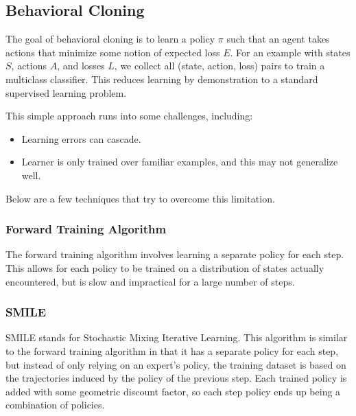 \documentclass[12pt,titlepage]{article}
\begin{document}
    \subsection{Behavioral Cloning}
      The goal of behavioral cloning is to learn a policy $\pi$ such that an agent takes actions that minimize some notion of expected loss $E$. For an example with
      states $S$, actions $A$, and losses $L$, we collect all (state, action, loss) pairs to train a multiclass classifier. This reduces learning by demonstration to
      a standard supervised learning problem.

      This simple approach runs into some challenges, including:
      \begin{itemize}
        \item Learning errors can cascade.
        \item Learner is only trained over familiar examples, and this may not generalize well.
      \end{itemize}

      Below are a few techniques that try to overcome this limitation.

      \subsubsection{Forward Training Algorithm}
        The forward training algorithm involves learning a separate policy for each step. This allows for each policy to be trained on a distribution of states
        actually encountered, but is slow and impractical for a large number of steps.

      \subsubsection{SMILE}
        SMILE stands for Stochastic Mixing Iterative Learning. This algorithm is similar to the forward training algorithm in that it has a separate policy for
        each step, but instead of only relying on an expert's policy, the training dataset is based on the trajectories induced by the policy of the previous
        step. Each trained policy is added with some geometric discount factor, so each step policy ends up being a combination of policies.
\end{document}
